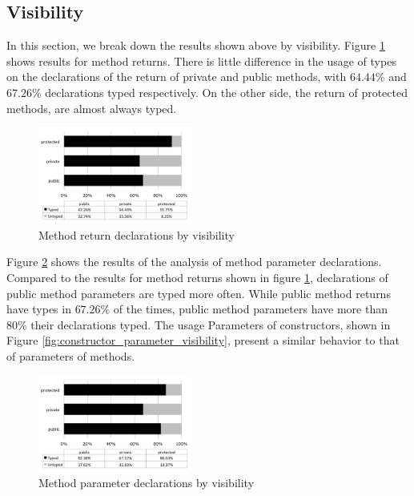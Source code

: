 \documentclass[preprint]{sigplanconf}
\begin{document}
\subsection{Visibility\label{sub:visibility-results}}
In this section, we break down the results shown above by visibility. 
Figure \ref{fig:method_return_visibility} shows results for method returns.
There is little difference in the usage of types on the declarations of the return of private and public methods, with $64.44\%$ and $67.26\%$ declarations typed respectively.
On the other side, the return of protected methods, are almost always typed.

\begin{figure}[ht]
\centering \includegraphics[width=0.45\textwidth]{images/method_return_visibility} 
\caption{Method return declarations by visibility}
\label{fig:method_return_visibility} 
\end{figure}

Figure \ref{fig:method_parameter_visibility} shows the results of the analysis of method parameter declarations. 
Compared to the results for method returns shown in figure \ref{fig:method_return_visibility}, declarations of public method parameters are typed more often.
While public method returns have types in $67.26\%$ of the times, public method parameters have more than $80\%$ their declarations typed. 
The usage 
Parameters of constructors, shown in Figure \ref{fig:constructor_parameter_visibility}, present a similar behavior to that of parameters of methods.

\begin{figure}[ht]
\centering \includegraphics[width=0.45\textwidth]{images/method_parameter_visibility} 
\caption{Method parameter declarations by visibility}
\label{fig:method_parameter_visibility} 
\end{figure}
\end{document}
